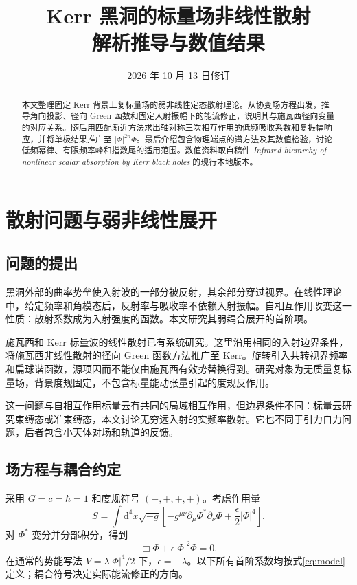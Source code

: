 \documentclass[UTF8,fontset=fandol,11pt,a4paper]{ctexart}
\title{\bfseries Kerr 黑洞的标量场非线性散射\\[3mm]\large 解析推导与数值结果}
\author{}
\date{2026 年 10 月 13 日修订}
\newcommand{\dd}{\mathrm d}
\numberwithin{equation}{section}
\begin{document}
\maketitle
\begin{abstract}
本文整理固定 Kerr 背景上复标量场的弱非线性定态散射理论。从协变场方程出发，推导角向投影、径向 Green 函数和固定入射振幅下的能流修正，说明其与施瓦西径向变量的对应关系。随后用匹配渐近方法求出轴对称三次相互作用的低频吸收系数和复振幅响应，并将单极结果推广至 $|\Phi|^{2n}\Phi$。最后介绍包含物理端点的谱方法及其数值检验，讨论低频幂律、有限频率峰和指数尾的适用范围。数值资料取自稿件 \emph{Infrared hierarchy of nonlinear scalar absorption by Kerr black holes} 的现行本地版本。
\end{abstract}
\tableofcontents
\clearpage

\section{散射问题与弱非线性展开}
\subsection{问题的提出}
黑洞外部的曲率势垒使入射波的一部分被反射，其余部分穿过视界。在线性理论中，给定频率和角模态后，反射率与吸收率不依赖入射振幅。自相互作用改变这一性质：散射系数成为入射强度的函数。本文研究其弱耦合展开的首阶项。

施瓦西和 Kerr 标量波的线性散射已有系统研究\cite{Sanchez1976,Futterman,GlampedakisAndersson2001}。这里沿用相同的入射边界条件，将施瓦西非线性散射的径向 Green 函数方法\cite{HeTianZhangManuscript2026}推广至 Kerr。旋转引入共转视界频率和扁球谐函数，源项因而不能仅由施瓦西有效势替换得到。研究对象为无质量复标量场，背景度规固定，不包含标量能动张量引起的度规反作用。

这一问题与自相互作用标量云\cite{YoshinoKodama2012,Baryakhtar2021,HerdeiroQCloud2014}有共同的局域相互作用，但边界条件不同：标量云研究束缚态或准束缚态，本文讨论无穷远入射的实频率散射。它也不同于引力自力问题\cite{BarackPound2019,PoundWardell2021}，后者包含小天体对场和轨道的反馈。

\subsection{场方程与耦合约定}
采用 $G=c=\hbar=1$ 和度规符号 $(-,+,+,+)$。考虑作用量
\begin{equation}
S=\int\dd^4x\sqrt{-g}\left[-g^{\mu\nu}\partial_\mu\Phi^*\partial_\nu\Phi
+\frac{\epsilon}{2}|\Phi|^4\right].
\end{equation}
对 $\Phi^*$ 变分并分部积分，得到
\begin{equation}\Box\Phi+\epsilon|\Phi|^2\Phi=0.\label{eq:model}\end{equation}
在通常的势能写法 $V=\lambda|\Phi|^4/2$ 下，$\epsilon=-\lambda$。以下所有首阶系数均按式\eqref{eq:model}定义；耦合符号决定实际能流修正的方向。
\end{document}
